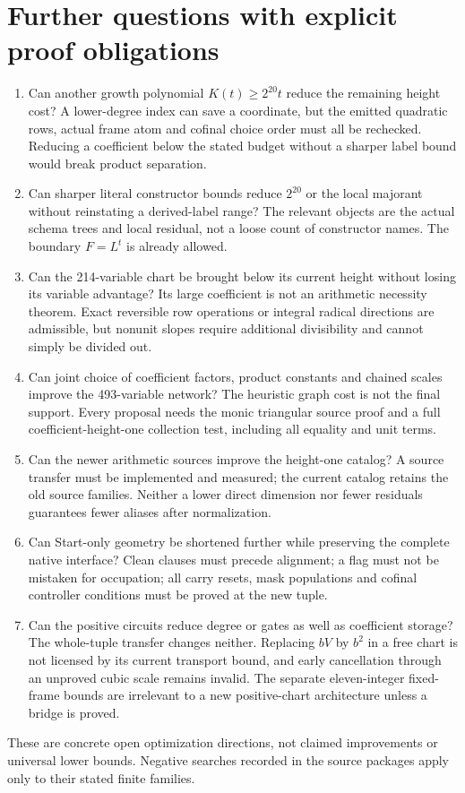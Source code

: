 \section{Further questions with explicit proof obligations}
\begin{enumerate}
\item Can another growth polynomial $K(t)\ge2^{20}t$ reduce the remaining
height cost? A lower-degree index can save a coordinate, but the emitted
quadratic rows, actual frame atom and cofinal choice order must all be
rechecked. Reducing a coefficient below the stated budget without a
sharper label bound would break product separation.
\item Can sharper literal constructor bounds reduce $2^{20}$ or the
local majorant without reinstating a derived-label range? The relevant
objects are the actual schema trees and local residual, not a loose
count of constructor names. The boundary $F=L^t$ is already allowed.
\item Can the 214-variable chart be brought below its current height
without losing its variable advantage? Its large coefficient is not an
arithmetic necessity theorem. Exact reversible row operations or integral
radical directions are admissible, but nonunit slopes require additional
divisibility and cannot simply be divided out.
\item Can joint choice of coefficient factors, product constants and
chained scales improve the 493-variable network? The heuristic graph
cost is not the final support. Every proposal needs the monic triangular
source proof and a full coefficient-height-one collection test, including
all equality and unit terms.
\item Can the newer arithmetic sources improve the height-one catalog?
A source transfer must be implemented and measured; the current catalog
retains the old source families. Neither a lower direct dimension nor
fewer residuals guarantees fewer aliases after normalization.
\item Can Start-only geometry be shortened further while preserving the
complete native interface? Clean clauses must precede alignment; a flag
must not be mistaken for occupation; all carry resets, mask populations
and cofinal controller conditions must be proved at the new tuple.
\item Can the positive circuits reduce degree or gates as well as
coefficient storage? The whole-tuple transfer changes neither. Replacing
$bV$ by $b^2$ in a free chart is not licensed by its current transport
bound, and early cancellation through an unproved cubic scale remains
invalid. The separate eleven-integer fixed-frame bounds are irrelevant
to a new positive-chart architecture unless a bridge is proved.
\end{enumerate}
These are concrete open optimization directions, not claimed improvements
or universal lower bounds. Negative searches recorded in the source
packages apply only to their stated finite families.
